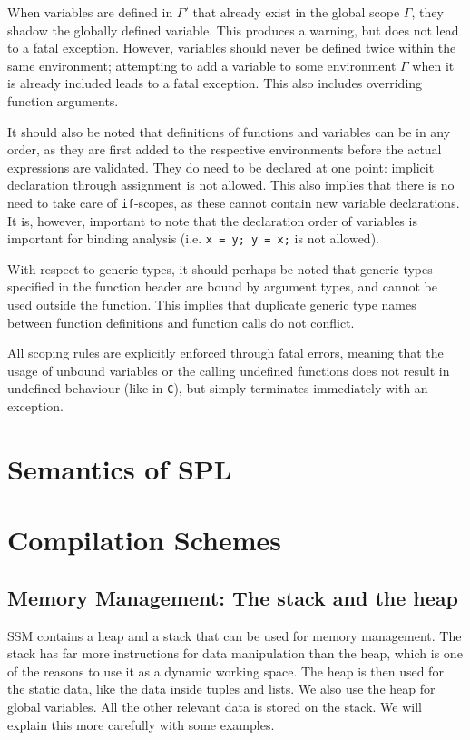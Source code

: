 \documentclass[a4paper]{article}
\begin{document}
When variables are defined in $\Gamma'$ that already exist in the global scope $\Gamma$, they shadow the globally defined variable. This produces a warning, but does not lead to a fatal exception. However, variables should never be defined twice within the same environment; attempting to add a variable to some environment $\Gamma$ when it is already included leads to a fatal exception. This also includes overriding function arguments.

It should also be noted that definitions of functions and variables can be in any order, as they are first added to the respective environments before the actual expressions are validated. They do need to be declared at one point: implicit declaration through assignment is not allowed. This also implies that there is no need to take care of {\tt if}-scopes, as these cannot contain new variable declarations. It is, however, important to note that the declaration order of variables is important for binding analysis (i.e. {\tt x = y; y = x;} is not allowed).

With respect to generic types, it should perhaps be noted that generic types specified in the function header are bound by argument types, and cannot be used outside the function. This implies that duplicate generic type names between function definitions and function calls do not conflict.

All scoping rules are explicitly enforced through fatal errors, meaning that the usage of unbound variables or the calling undefined functions does not result in undefined behaviour (like in {\tt C}), but simply terminates immediately with an exception.

\section{Semantics of SPL}

\section{Compilation Schemes}

\subsection{Memory Management: The stack and the heap}
SSM contains a heap and a stack that can be used for memory management. The stack has far more instructions for data manipulation than the heap, which is one of the reasons to use it as a dynamic working space. The heap is then used for the static data, like the data inside tuples and lists. We also use the heap for global variables. All the other relevant data is stored on the stack. We will explain this more carefully with some examples. 
\end{document}
